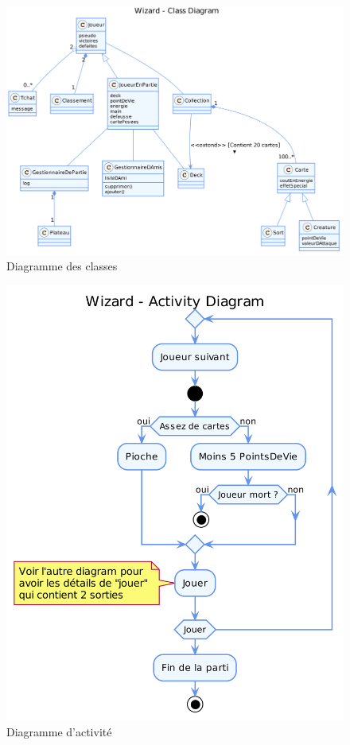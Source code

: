 \documentclass[11pt,a4paper]{article}
\begin{document}
\begin{figure}[ht]
  \centering
  \includegraphics[width=1\textwidth]{uml_files/ClassDiagram.png}
  \caption{\label{fig:class} Diagramme des classes}
\end{figure}

\begin{figure}[ht]
  \centering
  \includegraphics[width=1\textwidth]{uml_files/ActivityDiagram.png}
  \caption{\label{fig:class} Diagramme d'activité}
\end{figure}
\end{document}
